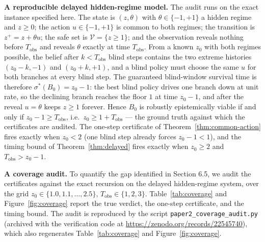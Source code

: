 \documentclass[10pt,twocolumn]{article}
\theoremstyle{definition}
\begin{document}
\textbf{A reproducible delayed hidden-regime model.} The audit runs on the exact instance specified here. The state is \((z, \theta)\) with \(\theta \in \{-1, +1\}\) a hidden regime and \(z \ge 0\); the action \(u \in \{-1, +1\}\) is common to both regimes; the transition is \(z^{+} = z + \theta u\); the safe set is \(\mathcal{V} = \{ z \ge 1 \}\); and the observation reveals nothing before \(T_{\mathrm{obs}}\) and reveals \(\theta\) exactly at time \(T_{\mathrm{obs}}\). From a known \(z_{0}\) with both regimes possible, the belief after \(k < T_{\mathrm{obs}}\) blind steps contains the two extreme histories \((z_{0} - k, -1)\) and \((z_{0} + k, +1)\), and a blind policy must choose the same \(u\) for both branches at every blind step. The guaranteed blind-window survival time is therefore \(\sigma^{*}(B_{0}) = z_{0} - 1\): the best blind policy drives one branch down at unit rate, so the declining branch reaches the floor \(1\) at time \(z_{0} - 1\), and after the reveal \(u = \theta\) keeps \(z \ge 1\) forever. Hence \(B_{0}\) is robustly epistemically viable if and only if \(z_{0} - 1 \ge T_{\mathrm{obs}}\), i.e.\ \(z_{0} \ge 1 + T_{\mathrm{obs}}\) --- the ground truth against which the certificates are audited. The one-step certificate of Theorem~\ref{thm:common-action} fires exactly when \(z_{0} < 2\) (one blind step already forces \(z_{0} - 1 < 1\)), and the timing bound of Theorem~\ref{thm:delayed} fires exactly when \(z_{0} \ge 2\) and \(T_{\mathrm{obs}} > z_{0} - 1\).


\textbf{A coverage audit.} To quantify the gap identified in Section 6.5, we audit the certificates against the exact recursion on the delayed hidden-regime system, over the grid \(z_{0} \in \{1.0, 1.1, \dots, 2.5\}\), \(T_{\mathrm{obs}} \in \{1,2,3\}\). Table~\ref{tab:coverage} and Figure~\ref{fig:coverage} report the true verdict, the one-step certificate, and the timing bound. The audit is reproduced by the script \texttt{paper2\_coverage\_audit.py} (archived with the verification code at \url{https://zenodo.org/records/22545740}), which also regenerates Table~\ref{tab:coverage} and Figure~\ref{fig:coverage}.
\end{document}
